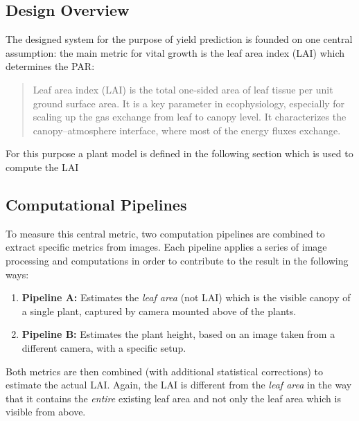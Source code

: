 \graphicspath{{members/ssr/figures/modelling}}

\subsection{Design Overview}


The designed system for the purpose of yield prediction is founded on one central assumption: 
the main metric for vital growth is the leaf area index (LAI) which determines the PAR:

\begin{quote}
    \centering
    Leaf area index (LAI) is the total one‐sided area of leaf tissue per unit ground surface area.
    It is a key parameter in ecophysiology, especially for scaling up the gas exchange from leaf
    to canopy level.
    It characterizes the canopy–atmosphere interface, where most of the energy fluxes exchange. \cite{breda}
\end{quote}

For this purpose a plant model is defined in the following section which is used to compute the LAI



\subsection{Computational Pipelines}

To measure this central metric, two computation pipelines are combined to extract specific metrics from images.
Each pipeline applies a series of image processing and computations in order to contribute to the result
in the following ways:

\begin{enumerate}
    \item \textbf{Pipeline A:} Estimates the \textit{leaf area} (not LAI) which is the visible canopy
    of a single plant, captured by camera mounted above of the plants.
    \item \textbf{Pipeline B:} Estimates the plant height, based on an image taken from a different camera,
    with a specific setup.
\end{enumerate}

Both metrics are then combined (with additional statistical corrections) to estimate the actual LAI.
Again, the LAI is different from the \textit{leaf area} in the way that it contains
the \textit{entire} existing leaf area and not only the leaf area which is visible from above.

